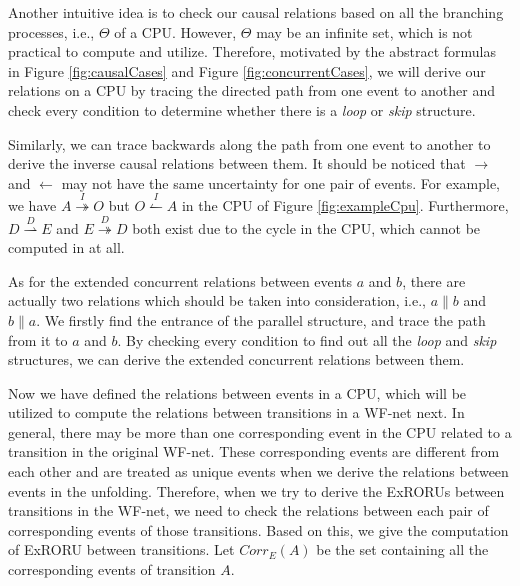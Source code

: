 \documentclass{llncs}
\begin{document}
Another intuitive idea is to check our causal relations based on all the branching processes, i.e., $\Theta$ of a CPU. However, $\Theta$ may be an infinite set, which is not practical to compute and utilize. Therefore, motivated by the abstract formulas in Figure \ref{fig:causalCases} and Figure \ref{fig:concurrentCases}, we will derive our relations on a CPU by tracing the directed path from one event to another and check every condition to determine whether there is a \textit{loop} or \textit{skip} structure.

Similarly, we can trace backwards along the path from one event to another to derive the inverse causal relations between them. It should be noticed that $\rightarrow$ and $\leftarrow$ may not have the same uncertainty for one pair of events. For example, we have $A\overset{I}{\twoheadrightarrow}O$ but $O\overset{I}{\leftharpoonup}A$ in the CPU of Figure \ref{fig:exampleCpu}. Furthermore, $D\overset{D}{\rightharpoonup}E$ and $E\overset{D}{\twoheadrightarrow}D$ both exist due to the cycle in the CPU, which cannot be computed in \cite{jin2014computing} at all.

As for the extended concurrent relations between events $a$ and $b$, there are actually two relations which should be taken into consideration, i.e., $a\parallel b$ and $b\parallel a$. We firstly find the entrance of the parallel structure, and trace the path from it to $a$ and $b$. By checking every condition to find out all the \textit{loop} and \textit{skip} structures, we can derive the extended concurrent relations between them.

Now we have defined the relations between events in a CPU, which will be utilized to compute the relations between transitions in a WF-net next. In general, there may be more than one corresponding event in the CPU related to a transition in the original WF-net. These corresponding events are different from each other and are treated as unique events when we derive the relations between events in the unfolding. Therefore, when we try to derive the ExRORUs between transitions in the WF-net, we need to check the relations between each pair of corresponding events of those transitions. Based on this, we give the computation of ExRORU between transitions. Let $Corr_{E}(A)$ be the set containing all the corresponding events of transition $A$.
\end{document}
